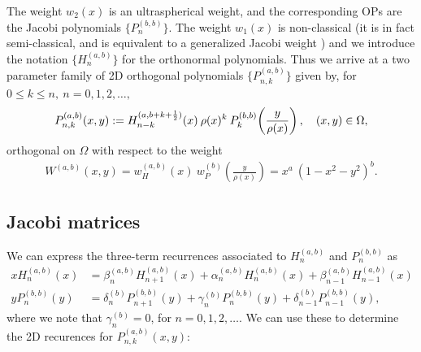 \documentclass[11pt, oneside]{article}   	%
\newcommand{\half}{\frac{1}{2}}
\newcommand{\Pnk}{P_{n,k}}
\newcommand{\Pnkab}{P_{n,k}^{(a,b)}}
\begin{document}
The weight $w_2(x)$ is an ultraspherical weight, and the corresponding OPs are   the Jacobi polynomials  \(\{P_n^{(b, b)}\}\). The weight $w_1(x)$ is non-classical (it is in fact semi-classical, and is equivalent to a generalized Jacobi weight \cite{magnus1995painleve}) and we introduce the notation \(\{H_n^{(a, b)}\}\) for the orthonormal polynomials. Thus we arrive at  a two parameter family of  2D orthogonal polynomials \(\{\Pnkab\}\) given by, for \(0 \le k \le n, \: n = 0,1,2,\dots,\)
\begin{align}
 \Pnk^{(a,b)}(x,y) := H_{n-k}^{(a, b+k+\half)}(x) \: \rho(x)^k \: P_k^{(b,b)}\fpr(\frac{y}{\rho(x)}), \quad (x,y) \in \Omega, 
\end{align}
orthogonal on \(\Omega\) with respect to the weight
\begin{align}
W^{(a,b)}(x,y) = w_H^{(a,b)}(x) \: w_P^{(b)}(\frac{y}{\rho(x)}) = x^a \: (1-x^2-y^2)^b.
\end{align}



\subsection{Jacobi matrices}

We can express the three-term recurrences associated to $H_n^{(a,b)}$ and $P_n^{(b,b)}$ as
\begin{align}
x H_n^{(a,b)}(x) &= \beta_n^{(a,b)} H_{n+1}^{(a,b)}(x) + \alpha_n^{(a,b)} H_n^{(a,b)}(x) + \beta_{n-1}^{(a,b)} H_{n-1}^{(a,b)}(x) \\
y P_n^{(b,b)}(y) &= \delta_n^{(b)} P_{n+1}^{(b,b)}(y) + \gamma_n^{(b)} P_n^{(b,b)}(y) + \delta_{n-1}^{(b)} P_{n-1}^{(b,b)}(y),
\end{align}
where we note that \(\gamma_n^{(b)} = 0\), for \( n = 0,1,2,\dots\). We can use these to determine the 2D recurences for $P_{n,k}^{(a,b)}(x,y)$:
\end{document}
